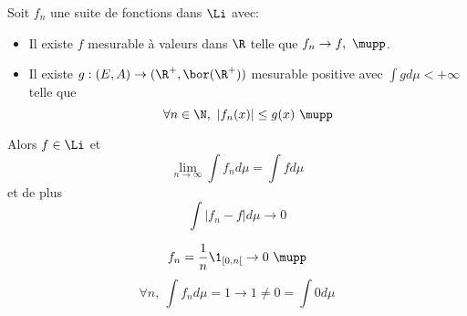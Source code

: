 \begin{theorem}
	Soit $f_n$ une suite de fonctions dans $\Li$ avec:
	\begin{itemize}
		\item Il existe $f$ mesurable à valeurs dans $\R$ telle que $f_n \to f, \ \mupp$.
		\item Il existe $g : (E,A) \to (\R^+, \bor(\R^+))$ mesurable positive avec $\int g d\mu < +\infty$ telle que
		      $$\forall n \in\N,\ |f_n(x)| \leq g(x)\ \mupp$$
	\end{itemize}

	Alors $f \in \Li$ et
	$$\lim_{n\to \infty} \int f_n d\mu= \int f d \mu$$
	et de plus
	$$ \int |f_n - f | d \mu \to 0 $$
\end{theorem}


\begin{exemple}
	$$f_n =\frac{1}{n} \1_{[0,n[} \to 0 \ \mupp$$
	$$ \forall n, \ \int f_n d\mu = 1 \to 1 \neq 0 = \int 0 d\mu$$
\end{exemple}

